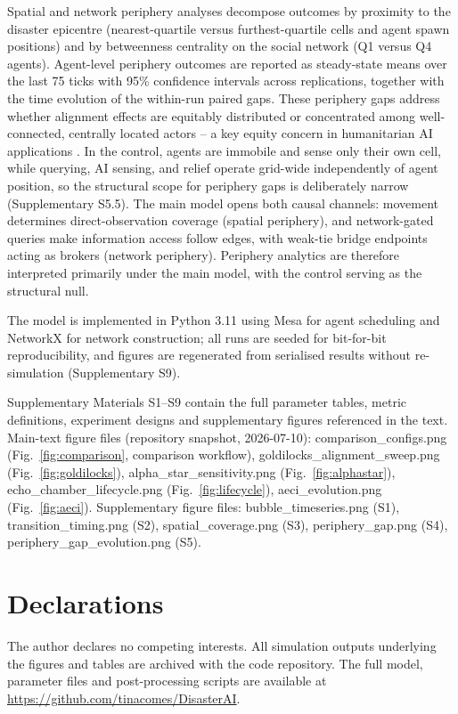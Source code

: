 \documentclass[pdflatex,sn-basic]{sn-jnl}
\begin{document}
Spatial and network periphery analyses decompose outcomes by proximity to the disaster epicentre (nearest-quartile versus furthest-quartile cells and agent spawn positions) and by betweenness centrality on the social network (Q1 versus Q4 agents). Agent-level periphery outcomes are reported as steady-state means over the last 75 ticks with 95\% confidence intervals across replications, together with the time evolution of the within-run paired gaps. These periphery gaps address whether alignment effects are equitably distributed or concentrated among well-connected, centrally located actors -- a key equity concern in humanitarian AI applications \citep{coleman2024weaving}. In the control, agents are immobile and sense only their own cell, while querying, AI sensing, and relief operate grid-wide independently of agent position, so the structural scope for periphery gaps is deliberately narrow (Supplementary S5.5). The main model opens both causal channels: movement determines direct-observation coverage (spatial periphery), and network-gated queries make information access follow edges, with weak-tie bridge endpoints acting as brokers (network periphery). Periphery analytics are therefore interpreted primarily under the main model, with the control serving as the structural null.

The model is implemented in Python 3.11 using Mesa for agent scheduling and NetworkX for network construction; all runs are seeded for bit-for-bit reproducibility, and figures are regenerated from serialised results without re-simulation (Supplementary S9).

\backmatter

Supplementary Materials S1--S9 contain the full parameter tables, metric definitions, experiment designs and supplementary figures referenced in the text. Main-text figure files (repository snapshot, 2026-07-10): comparison\_configs.png (Fig.~\ref{fig:comparison}, comparison workflow), goldilocks\_alignment\_sweep.png (Fig.~\ref{fig:goldilocks}), alpha\_star\_sensitivity.png (Fig.~\ref{fig:alphastar}), echo\_chamber\_lifecycle.png (Fig.~\ref{fig:lifecycle}), aeci\_evolution.png (Fig.~\ref{fig:aeci}). Supplementary figure files: bubble\_timeseries.png (S1), transition\_timing.png (S2), spatial\_coverage.png (S3), periphery\_gap.png (S4), periphery\_gap\_evolution.png (S5).


\section*{Declarations}

 The author declares no competing interests.
 All simulation outputs underlying the figures and tables are archived with the code repository.
 The full model, parameter files and post-processing scripts are available at \url{https://github.com/tinacomes/DisasterAI}.


\end{document}
